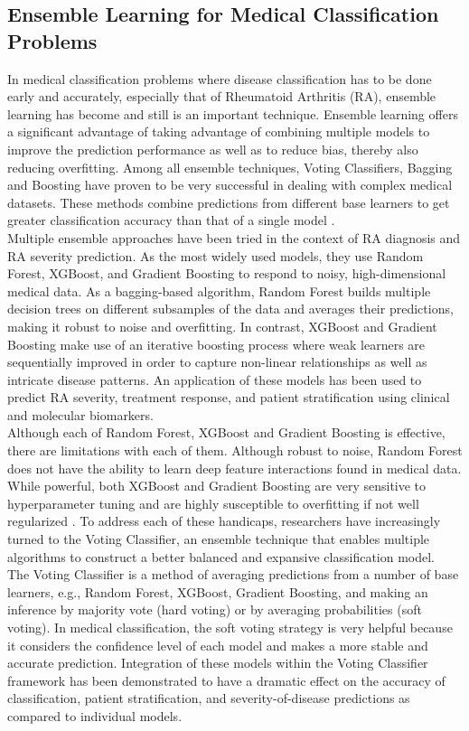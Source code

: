 \documentclass[10pt]{NSP1}
\begin{document}
	\subsection{Ensemble Learning for Medical Classification Problems}
	In medical classification problems where disease classification has to be done early and accurately, especially that of Rheumatoid Arthritis (RA), ensemble learning has become and still is an important technique. Ensemble learning offers a significant advantage of taking advantage of combining multiple models to improve the prediction performance as well as to reduce bias, thereby also reducing overfitting. Among all ensemble techniques, Voting Classifiers, Bagging and Boosting have proven to be very successful in dealing with complex medical datasets. These methods combine predictions from different base learners to get greater classification accuracy than that of a single model \cite{rani2022applying}.\\
	Multiple ensemble approaches have been tried in the context of RA diagnosis and RA severity prediction. As the most widely used models, they use Random Forest, XGBoost, and Gradient Boosting to respond to noisy, high-dimensional medical data. As a bagging-based algorithm, Random Forest builds multiple decision trees on different subsamples of the data and averages their predictions, making it robust to noise and overfitting. In contrast, XGBoost and Gradient Boosting make use of an iterative boosting process where weak learners are sequentially improved in order to capture non-linear relationships as well as intricate disease patterns. An application of these models has been used to predict RA severity, treatment response, and patient stratification using clinical and molecular biomarkers.\\
	Although each of Random Forest, XGBoost and Gradient Boosting is effective, there are limitations with each of them. Although robust to noise, Random Forest does not have the ability to learn deep feature interactions found in medical data. While powerful, both XGBoost and Gradient Boosting are very sensitive to hyperparameter tuning and are highly susceptible to overfitting if not well regularized \cite{khan2022improved}. To address each of these handicaps, researchers have increasingly turned to the Voting Classifier, an ensemble technique that enables multiple algorithms to construct a better balanced and expansive classification model.\\
	The Voting Classifier is a method of averaging predictions from a number of base learners, e.g., Random Forest, XGBoost, Gradient Boosting, and making an inference by majority vote (hard voting) or by averaging probabilities (soft voting). In medical classification, the soft voting strategy is very helpful because it considers the confidence level of each model and makes a more stable and accurate prediction. Integration of these models within the Voting Classifier framework has been demonstrated to have a dramatic effect on the accuracy of classification, patient stratification, and severity-of-disease predictions as compared to individual models.\\
\end{document}
